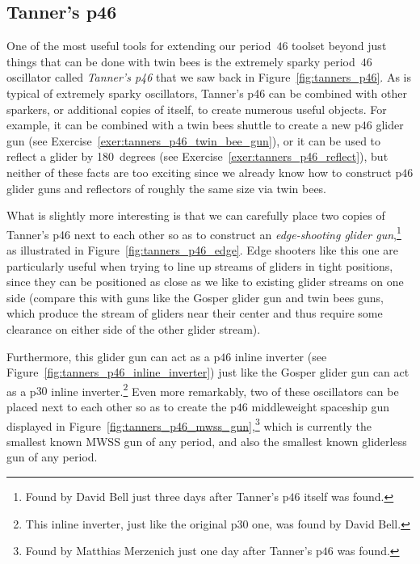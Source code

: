 \subsection{Tanner's p46}\label{sec:p46_tanner}

One of the most useful tools for extending our period~$46$ toolset beyond just things that can be done with twin bees is the extremely sparky period~$46$ oscillator called \emph{Tanner's p46} that we saw back in Figure~\ref{fig:tanners_p46}. As is typical of extremely sparky oscillators, Tanner's p46 can be combined with other sparkers, or additional copies of itself, to create numerous useful objects. For example, it can be combined with a twin bees shuttle to create a new p$46$ glider gun (see Exercise~\ref{exer:tanners_p46_twin_bee_gun}), or it can be used to reflect a glider by 180~degrees (see Exercise~\ref{exer:tanners_p46_reflect}), but neither of these facts are too exciting since we already know how to construct p$46$ glider guns and reflectors of roughly the same size via twin bees.

What is slightly more interesting is that we can carefully place two copies of Tanner's p46 next to each other so as to construct an \emph{edge-shooting glider gun},\footnote{Found by David Bell just three days after Tanner's p$46$ itself was found.} as illustrated in Figure~\ref{fig:tanners_p46_edge}. Edge shooters like this one are particularly useful when trying to line up streams of gliders in tight positions, since they can be positioned as close as we like to existing glider streams on one side (compare this with guns like the Gosper glider gun and twin bees guns, which produce the stream of gliders near their center and thus require some clearance on either side of the other glider stream).

Furthermore, this glider gun can act as a p$46$ inline inverter (see Figure~\ref{fig:tanners_p46_inline_inverter}) just like the Gosper glider gun can act as a p$30$ inline inverter.\footnote{This inline inverter, just like the original p$30$ one, was found by David Bell.} Even more remarkably, two of these oscillators can be placed next to each other so as to create the p$46$ middleweight spaceship gun displayed in Figure~\ref{fig:tanners_p46_mwss_gun},\footnote{Found by Matthias Merzenich just one day after Tanner's p$46$ was found.} which is currently the smallest known MWSS gun of any period, and also the smallest known gliderless gun of any period.


